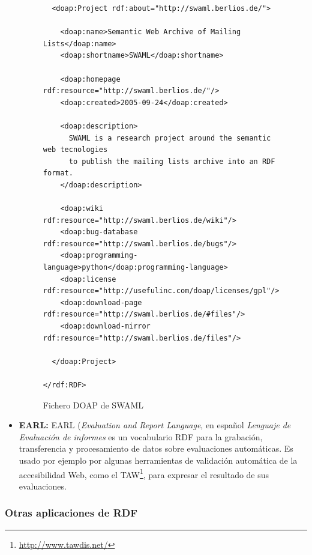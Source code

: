 \begin{itemize}
\begin{figure}[H]
\begin{lstlisting}
  <doap:Project rdf:about="http://swaml.berlios.de/">

    <doap:name>Semantic Web Archive of Mailing Lists</doap:name>
    <doap:shortname>SWAML</doap:shortname>

    <doap:homepage rdf:resource="http://swaml.berlios.de/"/>
    <doap:created>2005-09-24</doap:created>

    <doap:description>
      SWAML is a research project around the semantic web tecnologies 
      to publish the mailing lists archive into an RDF format.
    </doap:description>

    <doap:wiki rdf:resource="http://swaml.berlios.de/wiki"/>
    <doap:bug-database rdf:resource="http://swaml.berlios.de/bugs"/>
    <doap:programming-language>python</doap:programming-language>
    <doap:license rdf:resource="http://usefulinc.com/doap/licenses/gpl"/>
    <doap:download-page rdf:resource="http://swaml.berlios.de/#files"/>
    <doap:download-mirror rdf:resource="http://swaml.berlios.de/files"/>

  </doap:Project>

</rdf:RDF>
\end{lstlisting}
\caption{Fichero DOAP de SWAML}
\label{fig:ejemplo.doap}
\end{figure}

  \item \textbf{EARL:} EARL\cite{EARL} (\emph{Evaluation and Report Language}, 
	en español \emph{Lenguaje de Evaluación de informes} es un vocabulario 
     	RDF para la grabación, transferencia y procesamiento de datos sobre 
	evaluaciones automáticas. Es usado por ejemplo por algunas herramientas
	de validación automática de la accesibilidad Web, como el
	TAW\footnote{\url{http://www.tawdis.net/}}, para expresar el
	resultado de sus evaluaciones.

\end{itemize}

\subsubsection{Otras aplicaciones de RDF}

